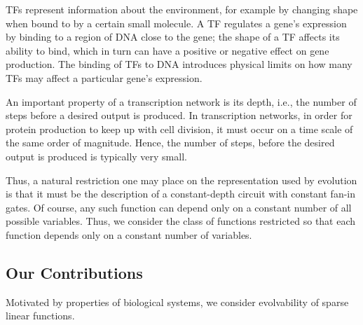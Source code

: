 
TFs represent information about the environment,
for example by changing shape when bound to by a certain small molecule.
A TF regulates a gene's expression by binding to a region of DNA close to the
gene; the shape of a TF affects its ability to bind,
which in turn can have a positive or negative effect on gene production.
The binding of TFs to DNA introduces physical limits on how many TFs may affect
a particular gene's expression.


An important property of a transcription network is its depth, i.e.,
the number of steps before a desired output is produced. In transcription
networks, in order for protein production to keep up with cell division,
it must occur on a time scale of the same order of magnitude. Hence, the
number of steps, before the desired output is produced is typically very small.


Thus, a natural restriction one may place on the representation used by
evolution is that it must be the description of a constant-depth circuit with
constant fan-in gates. Of course, any such function can depend only on a
constant number of all possible variables. Thus, we consider the class of
functions restricted so that each function depends only on a constant number of
variables.


\subsection{Our Contributions}

Motivated by properties of biological systems, we consider evolvability of
sparse linear functions.
